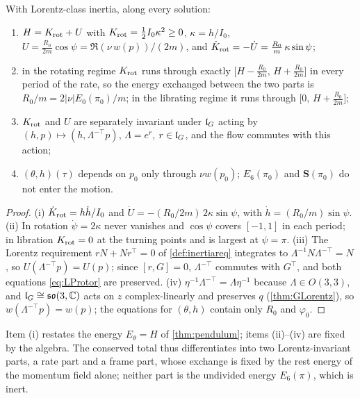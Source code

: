 \begin{proposition}
\label{cl:budget}
With Lorentz-class inertia, along every solution:
\begin{enumerate}[label=(\roman*),leftmargin=2.2em]
\item $H=K_{\rm rot}+U$ with $K_{\rm rot}=\tfrac12I_0\kappa^2\ge0$, $\kappa=h/I_0$, $U=\tfrac{R_0}{2m}\cos\psi=\Re(\nu\,w(p))/(2m)$, and
$\dot K_{\rm rot}=-\dot U=\tfrac{R_0}m\,\kappa\sin\psi$;
\item in the rotating regime $K_{\rm rot}$ runs through exactly $\bigl[H-\tfrac{R_0}{2m},\,H+\tfrac{R_0}{2m}\bigr]$ in every period of the rate, so the
energy exchanged between the two parts is $R_0/m=2|\nu|E_0(\pi_0)/m$; in the librating regime it runs through $\bigl[0,\,H+\tfrac{R_0}{2m}\bigr]$;
\item $K_{\rm rot}$ and $U$ are separately invariant under $\mathfrak l_G$ acting by $(h,p)\mapsto(h,\Lambda^{-\top}p)$, $\Lambda=e^r$, $r\in\mathfrak l_G$, and the flow
commutes with this action;
\item $(\theta,h)(\tau)$ depends on $p_0$ only through $\nu w(p_0)$; $E_6(\pi_0)$ and $\mathbf S(\pi_0)$ do not enter the motion.
\end{enumerate}
\end{proposition}

\begin{proof}
(i) $\dot K_{\rm rot}=h\dot h/I_0$ and $\dot U=-(R_0/2m)\,2\kappa\sin\psi$, with $\dot h=(R_0/m)\sin\psi$. (ii) In rotation $\dot\psi=2\kappa$ never
vanishes and $\cos\psi$ covers $[-1,1]$ in each period; in libration $K_{\rm rot}=0$ at the turning points and is largest at $\psi=\pi$. (iii) The
Lorentz requirement $rN+Nr^{\!\top}=0$ of \cref{def:inertiareq} integrates to $\Lambda^{-1}N\Lambda^{-\top}=N$, so $U(\Lambda^{-\top}p)=U(p)$; since
$[r,G]=0$, $\Lambda^{-\top}$ commutes with $G^{\!\top}$, and both equations \eqref{eq:LProtor} are preserved. (iv) $\eta^{-1}\Lambda^{-\top}=\Lambda\eta^{-1}$
because $\Lambda\in O(3,3)$, and $\mathfrak l_G\cong\mathfrak{so}(3,\mathbb{C})$ acts on $z$ complex-linearly and preserves $q$ (\cref{thm:GLorentz}), so
$w(\Lambda^{-\top}p)=w(p)$; the equations for $(\theta,h)$ contain only $R_0$ and $\varphi_0$.
\end{proof}

Item (i) restates the energy $E_\theta=H$ of \cref{thm:pendulum}; items (ii)--(iv) are fixed by the algebra. The conserved total thus
differentiates into two Lorentz-invariant parts, a rate part and a frame part, whose exchange is fixed by the rest energy of the momentum field
alone; neither part is the undivided energy $E_6(\pi)$, which is inert.

